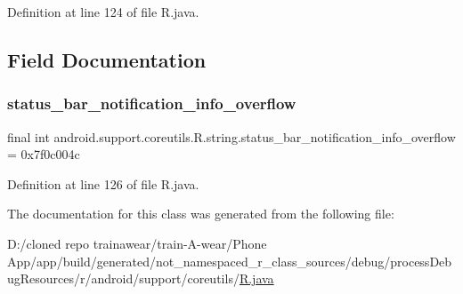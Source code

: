 Definition at line 124 of file R.\+java.


\begin{DoxyCode}{0}

\end{DoxyCode}


\subsection{Field Documentation}
\mbox{\label{classandroid_1_1support_1_1coreutils_1_1_r_1_1string_ac3802014c312560d8974b22579aba880}} 
\subsubsection{\texorpdfstring{status\_bar\_notification\_info\_overflow}{status\_bar\_notification\_info\_overflow}}
{\footnotesize\ttfamily final int android.\+support.\+coreutils.\+R.\+string.\+status\+\_\+bar\+\_\+notification\+\_\+info\+\_\+overflow = 0x7f0c004c\hspace{0.3cm}{\ttfamily [static]}}



Definition at line 126 of file R.\+java.



The documentation for this class was generated from the following file\+:\begin{DoxyCompactItemize}
\item 
D\+:/cloned repo trainawear/train-\/\+A-\/wear/\+Phone App/app/build/generated/not\+\_\+namespaced\+\_\+r\+\_\+class\+\_\+sources/debug/process\+Debug\+Resources/r/android/support/coreutils/\mbox{\hyperlink{process_debug_resources_2r_2android_2support_2coreutils_2_r_8java}{R.\+java}}\end{DoxyCompactItemize}
